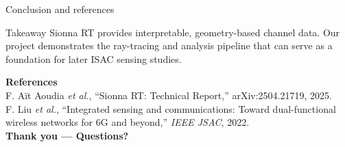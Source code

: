 \documentclass[aspectratio=169,10pt]{beamer}
\begin{document}
\begin{frame}{Conclusion and references}
\begin{block}{Takeaway}
Sionna RT provides interpretable, geometry-based channel data. Our project demonstrates the ray-tracing and analysis pipeline that can serve as a foundation for later ISAC sensing studies.
\end{block}
\vspace{6pt}\small
\textbf{References}\\[3pt]
F. A\"it Aoudia \emph{et al.}, ``Sionna RT: Technical Report,'' arXiv:2504.21719, 2025.\\[3pt]
F. Liu \emph{et al.}, ``Integrated sensing and communications: Toward dual-functional wireless networks for 6G and beyond,'' \emph{IEEE JSAC}, 2022.\\[8pt]
\centering\large\textcolor{accent}{\textbf{Thank you --- Questions?}}
\end{frame}
\end{document}
